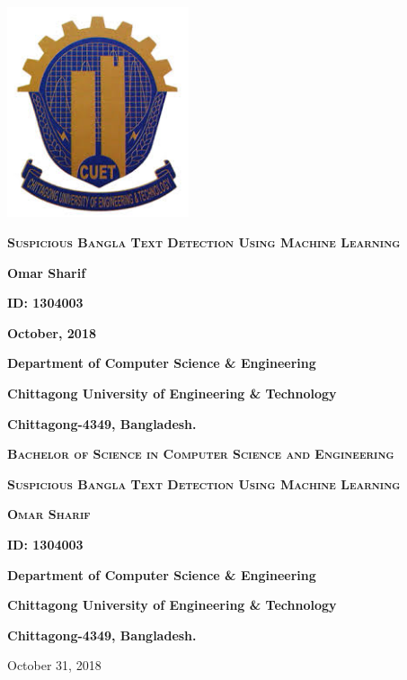 \begin{titlepage}
	\centering
	\includegraphics[width=0.4\textwidth]{Figures/Logo.jpeg}\par\vspace{1cm}
	\vspace{1cm}
		{\scshape\Large\bfseries Suspicious Bangla Text Detection Using Machine Learning  \par}
	\vspace{2cm}
	 
	\textbf{Omar Sharif}\par 
	\vspace{.5cm}
	\textbf{ID: 1304003}\par 
	\vspace{3cm}
	\textbf{October, 2018}
	
	\vspace{4cm}
	{\Large\bfseries Department of Computer Science \& Engineering\par}
	{\large\bfseries Chittagong University of Engineering \& Technology\par}
	{\bfseries Chittagong-4349, Bangladesh.}

	\vfill
\end{titlepage}

\begin{titlepage}
	\centering
	{\scshape\LARGE\bfseries Bachelor of Science in Computer Science and Engineering \par}
	\vspace{7cm}
	{\scshape\Large\bfseries Suspicious Bangla Text Detection Using Machine Learning \par}
	\vspace{3cm}
	{\scshape\bfseries Omar Sharif\par}
	{\scshape\bfseries ID: 1304003\par}
	
	\vspace{8cm}
	{\bfseries Department of Computer Science \& Engineering\par}
	{\bfseries Chittagong University of Engineering \& Technology\par}
	{\bfseries Chittagong-4349, Bangladesh.}

	\vfill

	{\large October 31, 2018\par}
\end{titlepage}


